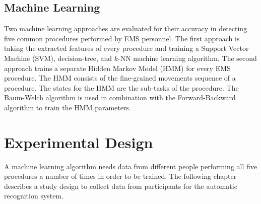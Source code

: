 \subsection{Machine Learning}
\label{sec:Approach:Machine-Learning}
Two machine learning approaches are evaluated for their accuracy in detecting five common procedures performed by EMS personnel. The first approach is taking the extracted features of every procedure and training a Support Vector Machine (SVM), decision-tree, and $k$-NN machine learning algorithm. The second approach trains a separate Hidden Markov Model (HMM) for every EMS procedure. The HMM consists of the fine-grained movements sequence of a procedure. The states for the HMM are the sub-tasks of the procedure. The Baum-Welch algorithm is used in combination with the Forward-Backward algorithm to train the HMM parameters.

\section{Experimental Design}
\label{sec:Experimental-Design}
A machine learning algorithm needs data from different people performing all five procedures a number of times in order to be trained. The following chapter describes a study design to collect data from participants for the automatic recognition system. 

